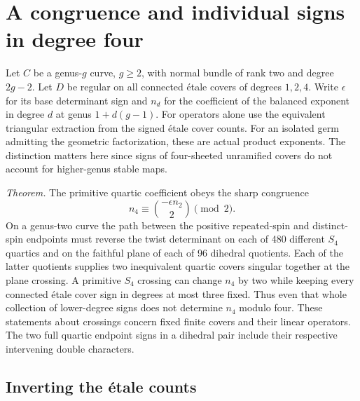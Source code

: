 \section{A congruence and individual signs in degree four}\label{sec:quartic}
Let \(C\) be a genus-\(g\) curve, \(g\ge2\), with normal bundle of rank two and degree \(2g-2\). Let \(D\) be regular on all connected étale covers of degrees \(1,2,4\). Write \(\epsilon\) for its base determinant sign and \(n_d\) for the coefficient of the balanced exponent in degree \(d\) at genus \(1+d(g-1)\). For operators alone use the equivalent triangular extraction from the signed étale cover counts. For an isolated germ admitting the geometric factorization, these are actual product exponents. The distinction matters here since signs of four-sheeted unramified covers do not account for higher-genus stable maps.

\emph{Theorem.} The primitive quartic coefficient obeys the sharp congruence
\begin{equation}
n_4\equiv \binom{-\epsilon n_2}{2}\pmod 2.                 \label{eq:quartic-congruence}
\end{equation}
On a genus-two curve the path between the positive repeated-spin and distinct-spin endpoints must reverse the twist determinant on each of 480 different \(S_4\) quartics and on the faithful plane of each of 96 dihedral quotients. Each of the latter quotients supplies two inequivalent quartic covers singular together at the plane crossing. A primitive \(S_4\) crossing can change \(n_4\) by two while keeping every connected étale cover sign in degrees at most three fixed. Thus even that whole collection of lower-degree signs does not determine \(n_4\) modulo four. These statements about crossings concern fixed finite covers and their linear operators. The two full quartic endpoint signs in a dihedral pair include their respective intervening double characters.

\subsection{Inverting the étale counts}

